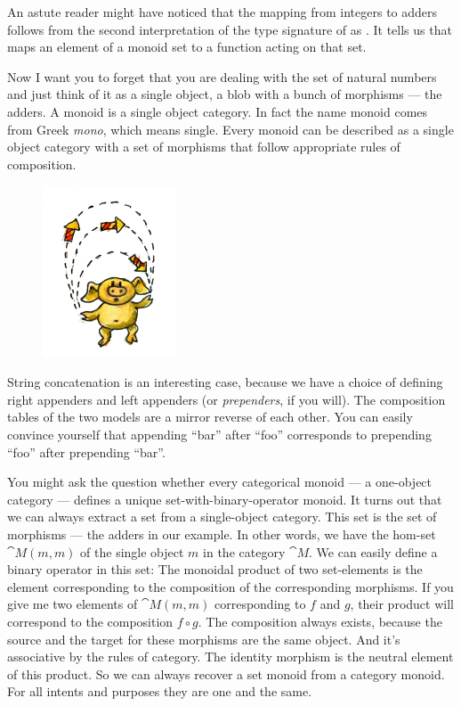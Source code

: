An astute reader might have noticed that the mapping from integers to
adders follows from the second interpretation of the type signature of
 as . It
tells us that  maps an element of a monoid set to a
function acting on that set.

Now I want you to forget that you are dealing with the set of natural
numbers and just think of it as a single object, a blob with a bunch of
morphisms --- the adders. A monoid is a single object category. In fact
the name monoid comes from Greek \emph{mono}, which means single. Every
monoid can be described as a single object category with a set of
morphisms that follow appropriate rules of composition.

\begin{figure}[H]
\centering\includegraphics[width=40mm]{images/monoid.jpg}
\end{figure}

String concatenation is an interesting case, because we have a choice of
defining right appenders and left appenders (or \emph{prependers}, if
you will). The composition tables of the two models are a mirror reverse
of each other. You can easily convince yourself that appending ``bar''
after ``foo'' corresponds to prepending ``foo'' after prepending
``bar''.

You might ask the question whether every categorical monoid --- a
one-object category --- defines a unique set-with-binary-operator
monoid. It turns out that we can always extract a set from a
single-object category. This set is the set of morphisms --- the adders
in our example. In other words, we have the hom-set $\cat{M}(m, m)$ of the
single object $m$ in the category $\cat{M}$. We can easily define a binary
operator in this set: The monoidal product of two set-elements is the
element corresponding to the composition of the corresponding morphisms.
If you give me two elements of $\cat{M}(m, m)$ corresponding to $f$ and
$g$, their product will correspond to the composition
$f \circ g$. The composition always exists, because the source and the
target for these morphisms are the same object. And it's associative by
the rules of category. The identity morphism is the neutral element of
this product. So we can always recover a set monoid from a category
monoid. For all intents and purposes they are one and the same.

